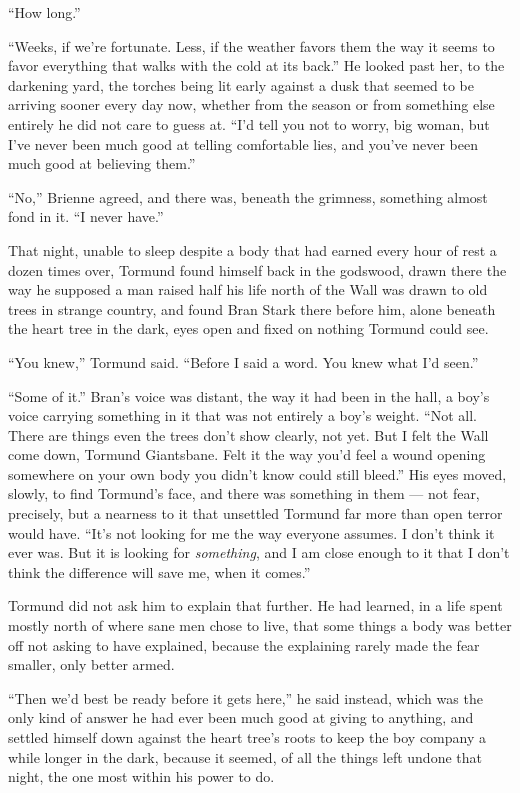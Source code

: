 “How long.”

“Weeks, if we’re fortunate. Less, if the weather favors them the way it seems to favor everything that walks with the cold at its back.” He looked past her, to the darkening yard, the torches being lit early against a dusk that seemed to be arriving sooner every day now, whether from the season or from something else entirely he did not care to guess at. “I’d tell you not to worry, big woman, but I’ve never been much good at telling comfortable lies, and you’ve never been much good at believing them.”

“No,” Brienne agreed, and there was, beneath the grimness, something almost fond in it. “I never have.”

\sceneBreak

That night, unable to sleep despite a body that had earned every hour of rest a dozen times over, Tormund found himself back in the godswood, drawn there the way he supposed a man raised half his life north of the Wall was drawn to old trees in strange country, and found Bran Stark there before him, alone beneath the heart tree in the dark, eyes open and fixed on nothing Tormund could see.

“You knew,” Tormund said. “Before I said a word. You knew what I’d seen.”

“Some of it.” Bran’s voice was distant, the way it had been in the hall, a boy’s voice carrying something in it that was not entirely a boy’s weight. “Not all. There are things even the trees don’t show clearly, not yet. But I felt the Wall come down, Tormund Giantsbane. Felt it the way you’d feel a wound opening somewhere on your own body you didn’t know could still bleed.” His eyes moved, slowly, to find Tormund’s face, and there was something in them — not fear, precisely, but a nearness to it that unsettled Tormund far more than open terror would have. “It’s not looking for me the way everyone assumes. I don’t think it ever was. But it is looking for \textit{something}, and I am close enough to it that I don’t think the difference will save me, when it comes.”

Tormund did not ask him to explain that further. He had learned, in a life spent mostly north of where sane men chose to live, that some things a body was better off not asking to have explained, because the explaining rarely made the fear smaller, only better armed.

“Then we’d best be ready before it gets here,” he said instead, which was the only kind of answer he had ever been much good at giving to anything, and settled himself down against the heart tree’s roots to keep the boy company a while longer in the dark, because it seemed, of all the things left undone that night, the one most within his power to do.
